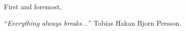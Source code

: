 \documentclass[
11pt, %
english, %
singlespacing, %
headsepline, %
]{MastersDoctoralThesis} %
\begin{document}
\begin{acknowledgements}
\addchaptertocentry{\acknowledgementname} %
\vspace{0.8cm}
First and foremost, 
\end{acknowledgements}




\newpage
\vspace*{0.4\textheight}
\begin{center}
	\noindent\enquote{\itshape Everything always breaks...}\bigbreak
	Tobias Hakan Bjorn Persson.
\end{center}



\tableofcontents %

\listoffigures %

\listoftables %


\end{document}
